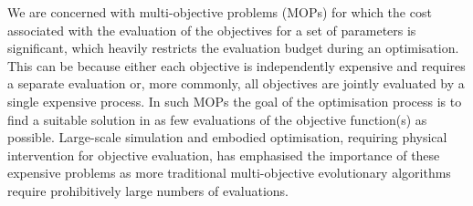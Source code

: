 \documentclass[conference]{IEEEtran}
\newcommand{\rmenote}[2][\textcolor{magenta}{\dagger}]{$#1$\marginpar{\color{magenta}\raggedright\tiny$#1$ #2}}
\begin{document}
We are concerned with multi-objective problems (MOPs) for which the cost associated with the evaluation of the objectives for a set of parameters is significant, which heavily restricts the evaluation budget during an  optimisation. This can be because either each objective is independently expensive and requires a separate evaluation or, more commonly, all objectives are jointly evaluated by a single expensive process. In such MOPs the goal of the optimisation process is to find a suitable solution in as few evaluations of the objective function(s) as possible.  Large-scale simulation and embodied optimisation, requiring physical intervention for objective evaluation, has emphasised the importance of these expensive problems \cite{osio1996engineering,  li2017rapid, jeong2005efficient, fang2017design, huband2005scalable} as more traditional multi-objective evolutionary algorithms require prohibitively large numbers of evaluations. 
\end{document}
